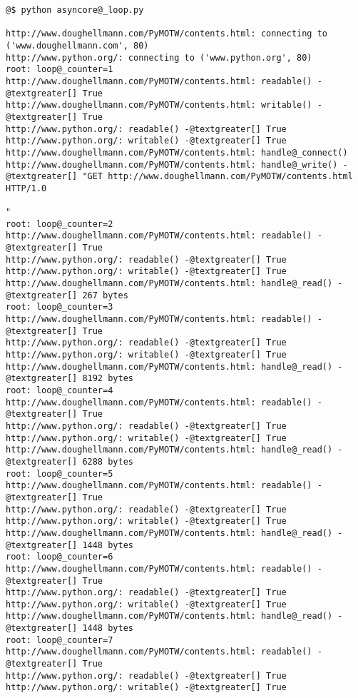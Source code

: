 \documentclass[a4paper,10pt,english]{manual}
\begin{document}
\begin{Verbatim}[commandchars=@\[\]]
@$ python asyncore@_loop.py

http://www.doughellmann.com/PyMOTW/contents.html: connecting to ('www.doughellmann.com', 80)
http://www.python.org/: connecting to ('www.python.org', 80)
root: loop@_counter=1
http://www.doughellmann.com/PyMOTW/contents.html: readable() -@textgreater[] True
http://www.doughellmann.com/PyMOTW/contents.html: writable() -@textgreater[] True
http://www.python.org/: readable() -@textgreater[] True
http://www.python.org/: writable() -@textgreater[] True
http://www.doughellmann.com/PyMOTW/contents.html: handle@_connect()
http://www.doughellmann.com/PyMOTW/contents.html: handle@_write() -@textgreater[] "GET http://www.doughellmann.com/PyMOTW/contents.html HTTP/1.0

"
root: loop@_counter=2
http://www.doughellmann.com/PyMOTW/contents.html: readable() -@textgreater[] True
http://www.python.org/: readable() -@textgreater[] True
http://www.python.org/: writable() -@textgreater[] True
http://www.doughellmann.com/PyMOTW/contents.html: handle@_read() -@textgreater[] 267 bytes
root: loop@_counter=3
http://www.doughellmann.com/PyMOTW/contents.html: readable() -@textgreater[] True
http://www.python.org/: readable() -@textgreater[] True
http://www.python.org/: writable() -@textgreater[] True
http://www.doughellmann.com/PyMOTW/contents.html: handle@_read() -@textgreater[] 8192 bytes
root: loop@_counter=4
http://www.doughellmann.com/PyMOTW/contents.html: readable() -@textgreater[] True
http://www.python.org/: readable() -@textgreater[] True
http://www.python.org/: writable() -@textgreater[] True
http://www.doughellmann.com/PyMOTW/contents.html: handle@_read() -@textgreater[] 6288 bytes
root: loop@_counter=5
http://www.doughellmann.com/PyMOTW/contents.html: readable() -@textgreater[] True
http://www.python.org/: readable() -@textgreater[] True
http://www.python.org/: writable() -@textgreater[] True
http://www.doughellmann.com/PyMOTW/contents.html: handle@_read() -@textgreater[] 1448 bytes
root: loop@_counter=6
http://www.doughellmann.com/PyMOTW/contents.html: readable() -@textgreater[] True
http://www.python.org/: readable() -@textgreater[] True
http://www.python.org/: writable() -@textgreater[] True
http://www.doughellmann.com/PyMOTW/contents.html: handle@_read() -@textgreater[] 1448 bytes
root: loop@_counter=7
http://www.doughellmann.com/PyMOTW/contents.html: readable() -@textgreater[] True
http://www.python.org/: readable() -@textgreater[] True
http://www.python.org/: writable() -@textgreater[] True

\end{Verbatim}
\end{document}
